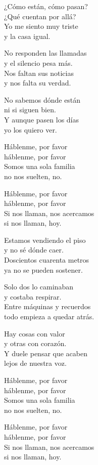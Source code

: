 \begin{lyrics}
¿Cómo están, cómo pasan?\\
¿Qué cuentan por allá?\\
Yo me siento muy triste\\
y la casa igual.

No responden las llamadas\\
y el silencio pesa más.\\
Nos faltan sus noticias\\
y nos falta su verdad.

No sabemos dónde están\\
ni si siguen bien.\\
Y aunque pasen los días\\
yo los quiero ver.

Háblenme, por favor\\
háblenme, por favor\\
Somos una sola familia\\
no nos suelten, no.

Háblenme, por favor\\
háblenme, por favor\\
Si nos llaman, nos acercamos\\
si nos llaman, hoy.

Estamos vendiendo el piso\\
y no sé dónde caer.\\
Doscientos cuarenta metros\\
ya no se pueden sostener.

Solo dos lo caminaban\\
y costaba respirar.\\
Entre máquinas y recuerdos\\
todo empieza a quedar atrás.

Hay cosas con valor\\
y otras con corazón.\\
Y duele pensar que acaben\\
lejos de nuestra voz.

Háblenme, por favor\\
háblenme, por favor\\
Somos una sola familia\\
no nos suelten, no.

Háblenme, por favor\\
háblenme, por favor\\
Si nos llaman, nos acercamos\\
si nos llaman, hoy.


\end{lyrics}
